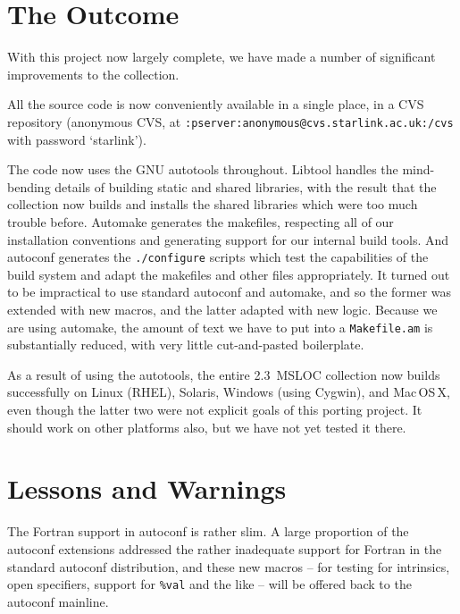 \documentclass[11pt,twoside]{article}
\begin{document}



\section{The Outcome\label{s:result}}

With this project now largely complete, we have made a number of
significant improvements to the collection.

All the source code is now conveniently available in a single place,
in a CVS repository (anonymous CVS, at
\texttt{:pserver:anonymous@cvs.starlink.ac.uk:/cvs} with password
`starlink').

The code now uses the GNU autotools throughout.  Libtool handles the
mind-bending details of building static and shared libraries, with the
result that the collection now builds and installs the shared
libraries which were too much trouble before.  Automake generates the
makefiles, respecting all of our installation conventions and
generating support for our internal build tools.  And autoconf
generates the \texttt{./configure} scripts which test the capabilities
of the build system and adapt the makefiles and other files
appropriately.  It turned out to be impractical to use standard
autoconf and automake, and so the former was extended with new macros,
and the latter adapted with new logic.  Because we are using automake,
the amount of text we have to put into a \texttt{Makefile.am} is
substantially reduced, with very little cut-and-pasted boilerplate.

As a result of using the autotools, the entire 2.3~MSLOC collection
now builds successfully on Linux (RHEL), Solaris, Windows (using
Cygwin), and Mac\,OS\,X, even though the latter two were not explicit
goals of this porting project.  It should work on other platforms
also, but we have not yet tested it there.



\section{Lessons and Warnings\label{s:lessons}}

The Fortran support in autoconf is rather slim.  A large proportion of the
autoconf extensions addressed the rather inadequate support for
Fortran in the standard autoconf distribution, and these new macros -- for
testing for intrinsics, open specifiers, support for \texttt{\%val}
and the like -- will be offered back to the autoconf mainline.
\end{document}
